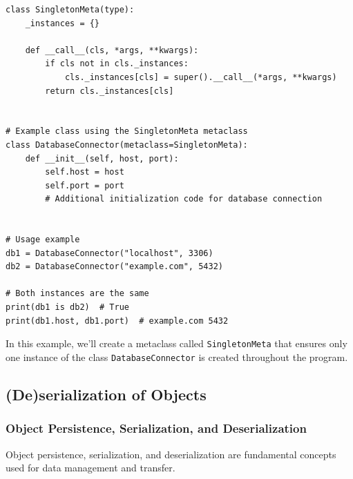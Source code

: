 \begin{codebox}
\begin{verbatim}
class SingletonMeta(type):
    _instances = {}

    def __call__(cls, *args, **kwargs):
        if cls not in cls._instances:
            cls._instances[cls] = super().__call__(*args, **kwargs)
        return cls._instances[cls]


# Example class using the SingletonMeta metaclass
class DatabaseConnector(metaclass=SingletonMeta):
    def __init__(self, host, port):
        self.host = host
        self.port = port
        # Additional initialization code for database connection


# Usage example
db1 = DatabaseConnector("localhost", 3306)
db2 = DatabaseConnector("example.com", 5432)

# Both instances are the same
print(db1 is db2)  # True
print(db1.host, db1.port)  # example.com 5432
\end{verbatim}
\end{codebox}

In this example, we'll create a metaclass called \texttt{SingletonMeta} that ensures only one instance of the class \texttt{DatabaseConnector} is created throughout the program.

\newpage
\subsection{(De)serialization of Objects}

\subsubsection{Object Persistence, Serialization, and Deserialization}
Object persistence, serialization, and deserialization are fundamental concepts used for data management and transfer.

